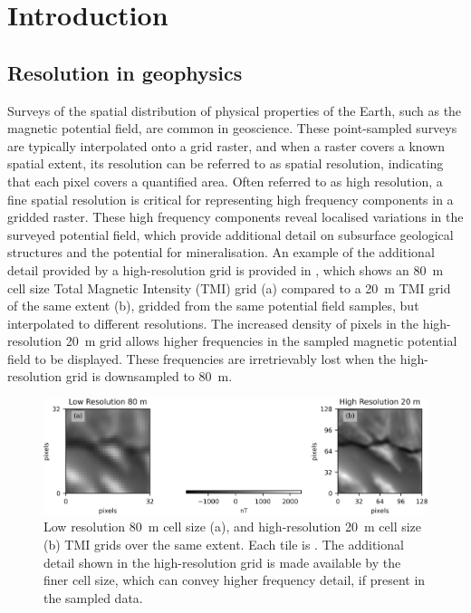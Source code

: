 \section{Introduction}
\subsection{Resolution in geophysics}
\label{sec:resingeo}
Surveys of the spatial distribution of physical properties of the Earth, such as the magnetic potential field, are common in geoscience.
These point-sampled surveys are typically interpolated onto a grid raster, and when a raster covers a known spatial extent, its resolution can be referred to as spatial resolution, indicating that each pixel covers a quantified area.
Often referred to as high resolution, a fine spatial resolution is critical for representing high frequency components in a gridded raster.
These high frequency components reveal localised variations in the surveyed potential field, which provide additional detail on subsurface geological structures and the potential for mineralisation.
An example of the additional detail provided by a high-resolution grid is provided in , which shows an \qty{80}{\metre} cell size Total Magnetic Intensity (TMI) grid (a) compared to a \qty{20}{\metre} TMI grid of the same  extent (b), gridded from the same potential field samples, but interpolated to different resolutions.
The increased density of pixels in the high-resolution \qty{20}{\metre} grid allows higher frequencies in the sampled magnetic potential field to be displayed.
These frequencies are irretrievably lost when the high-resolution grid is downsampled to \qty{80}{\metre}.

\begin{figure}[hbtp]
    \centering
    \includegraphics[width=\linewidth]{fig/p1/lrandhr.jpg}
    \caption[Comparison of different resolution grids]{Low resolution \qty{80}{\metre} cell size (a), and high-resolution \qty{20}{\metre} cell size (b) TMI grids over the same extent.
        Each tile is .
        The additional detail shown in the high-resolution grid is made available by the finer cell size, which can convey higher frequency detail, if present in the sampled data.}
    \label{fig:lrandhr}
\end{figure}


